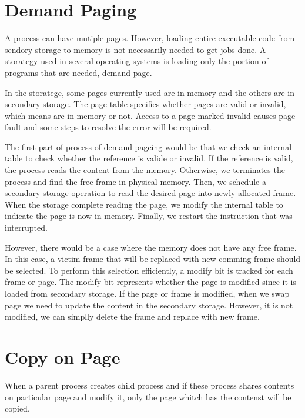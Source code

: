 \section{Demand Paging}
\label{sec:history}
A process can have mutiple pages. However, loading entire executable code from sendory storage to memory is not necessarily needed to 
get jobs done. A storategy used in several operating systems is loading only the portion of programs that are needed, demand page. 

In the storatege, some pages currently used are in memory and the others are in secondary storage. 
The page table specifies whether pages are valid or invalid, which means are in memory or not. 
Access to a page marked invalid causes page fault and some steps to resolve the error will be required. 

The first part of process of demand pageing would be that we check an internal table to check whether the reference is valide or invalid.
If the reference is valid, the process reads the content from the memory. Otherwise, we terminates the process and find the free frame in 
physical memory. Then, we schedule a secondary storage operation to read the desired page into newly allocated frame. 
When the storage complete reading the page, we modify the internal table to indicate the page is now in memory. 
Finally, we restart the instruction that was interrupted. 

However, there would be a case where the memory does not have any free frame. In this case, a victim frame that will be replaced with new comming frame should be selected. 
To perform this selection efficiently, a modify bit is tracked for each frame or page. The modify bit represents whether the page is modified since it is loaded from secondary storage. 
If the page or frame is modified, when we swap page we need to update the content in the secondary storage. However, it is not modified, we can simplly delete the frame and replace with new frame.



\section{Copy on Page}
\label{sec:history}
When a parent process creates child process and if these process shares contents on particular page and modify it, 
only the page whitch has the contenst will be copied.